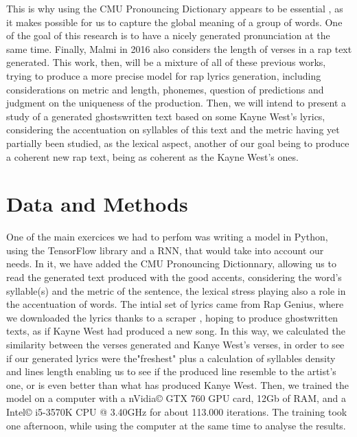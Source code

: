 \documentclass[12pt,a4paper]{article}
\begin{document}
This is why using the CMU Pronouncing Dictionary appears to be essential \cite{hirjee_using_2010}, as it makes possible for us to capture the global meaning of a group of words. One of the goal of this research is to have a nicely generated pronunciation at the same time. Finally, Malmi in 2016 \cite{malmi_dopelearning:_2016} also considers the length of verses in a rap text generated. This work, then, will be a mixture of all of these previous works, trying to produce a more precise model for rap lyrics generation, including considerations on metric and length, phonemes, question of predictions and judgment on the uniqueness of the production. Then, we will intend to present a study of a generated ghostswritten text based on some Kayne West's lyrics, considering the accentuation on syllables of this text and the metric having yet partially been studied, as the lexical aspect, another of our goal being to produce a coherent new rap text, being as coherent as the Kayne West's ones. \newline

\section{Data and Methods}

One of the main exercices we had to perfom was writing a model in Python, using the TensorFlow library and a RNN, that would take into account our needs. In it, we have added the CMU Pronouncing Dictionnary, allowing us to read the generated text produced with the good accents, considering the word's syllable(s) and the metric of the sentence, the lexical stress playing also a role in the accentuation of words. The intial set of lyrics came from Rap Genius, where we downloaded the lyrics thanks to a scraper \cite{paupier_raplyrics-scraper_2018}, hoping to produce ghostwritten texts, as if Kayne West had produced a new song. In this way, we calculated the similarity between the verses generated and Kanye West's verses, in order to see if our generated lyrics were the"freshest" plus a calculation of syllables density and lines length enabling us to see if the produced line resemble to the artist’s one, or is even better than what has produced Kanye West. Then, we trained the model on a computer with a nVidia© GTX 760 GPU card, 12Gb of RAM, and a Intel©  i5-3570K CPU @ 3.40GHz for about 113.000 iterations. The training took one afternoon, while using the computer at the same time to analyse the results. \newline
\end{document}
